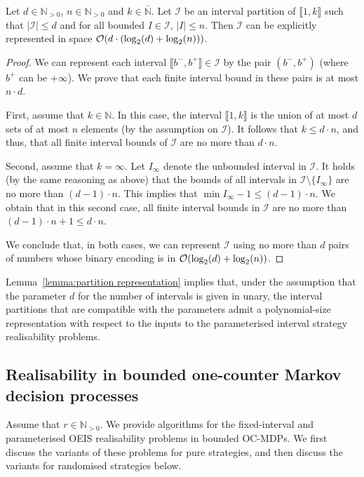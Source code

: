 \documentclass[a4paper,UKenglish,cleveref,autoref,thm-restate,colorlinks]{lipics-v2021}
\newcommand{\integerInterval}[1]{\llbracket{}#1\rrbracket{}}
\newcommand{\IN}{\mathbb{N}}
\newcommand{\INpos}{\IN_{>0}}
\newcommand{\INbar}{\bar{\IN}}
\newcommand{\ocCount}{k}
\newcommand{\counterUB}{r}
\newcommand{\intPart}{\mathcal{I}}
\newcommand{\interval}{I}
\newcommand{\intNum}{d}
\newcommand{\intSize}{n}
\newcommand{\intBound}{b}
\newcommand{\intLB}{\intBound^-}
\newcommand{\intUB}{\intBound^+}
\begin{document}
\begin{lemma}\label{lemma:partition representation}
  Let $\intNum\in\INpos$, $\intSize\in\INpos$ and $\ocCount\in\INbar$.
  Let $\intPart$ be an interval partition of $\integerInterval{1, \ocCount}$ such that $|\intPart|\leq\intNum$ and for all bounded $\interval\in\intPart$, $|\interval|\leq\intSize$.
  Then $\intPart$ can be explicitly represented in space $\bigo(\intNum\cdot(\log_2(\intNum) + \log_2(\intSize)))$. \end{lemma}
\begin{proof}
  We can represent each interval $\integerInterval{\intLB, \intUB}\in\intPart$ by the pair $(\intLB, \intUB)$ (where $\intUB$ can be $+\infty$).
  We prove that each finite interval bound in these pairs is at most $\intSize\cdot\intNum$.

  First, assume that $\ocCount\in\IN$.
  In this case, the interval $\integerInterval{1, \ocCount}$ is the union of at most $\intNum$ sets of at most $\intSize$ elements (by the assumption on $\intPart$).
  It follows that $\ocCount\leq\intNum\cdot\intSize$, and thus, that all finite interval bounds of $\intPart$ are no more than $\intNum\cdot\intSize$.

  Second, assume that $\ocCount=\infty$.
  Let $\interval_\infty$ denote the unbounded interval in $\intPart$.
  It holds (by the same reasoning as above) that the bounds of all intervals in $\intPart\setminus\{\interval_\infty\}$ are no more than $(\intNum-1)\cdot\intSize$.
  This implies that $\min\interval_\infty - 1\leq (\intNum-1)\cdot\intSize$.
  We obtain that in this second case, all finite interval bounds in $\intPart$ are no more than $(\intNum-1)\cdot\intSize + 1\leq\intNum\cdot\intSize$.
  
  We conclude that, in both cases, we can represent $\intPart$ using no more than $\intNum$ pairs of numbers whose binary encoding is in $\bigo(\log_2(\intNum)+\log_2(\intSize))$.
\end{proof}

Lemma~\ref{lemma:partition representation} implies that, under the assumption that the parameter $\intNum$ for the number of intervals is given in unary, the interval partitions that are compatible with the parameters admit a polynomial-size representation with respect to the inputs to the parameterised interval strategy realisability problems.

\subsection{Realisability in bounded one-counter Markov decision processes}\label{section:realisability:bounded}
Assume that $\counterUB\in\INpos$.
We provide algorithms for the fixed-interval and parameterised OEIS realisability problems in bounded OC-MDPs.
We first discuss the variants of these problems for pure strategies, and then discuss the variants for randomised strategies below.
\end{document}
